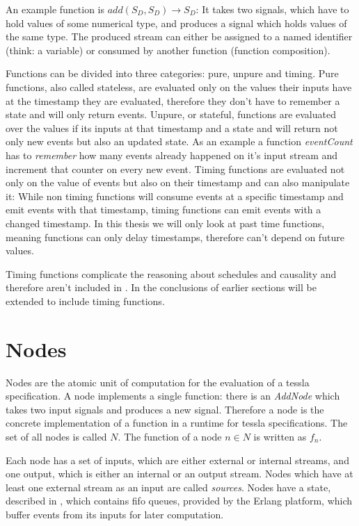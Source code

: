 An example function is \(\mathit{add}(S_D,S_D) \rightarrow S_D\): It takes two signals, which have to hold values of some numerical type, and produces a signal which holds values of the same type.
The produced stream can either be assigned to a named identifier (think: a variable) or consumed by another function (function composition).

Functions can be divided into three categories: pure, unpure and timing.
Pure functions, also called stateless, are evaluated only on the values their inputs have at the timestamp they are evaluated, therefore they don't have to remember a state and will only return events.
Unpure, or stateful, functions are evaluated over the values if its inputs at that timestamp and a state and will return not only new events but also an updated state.
As an example a function \emph{eventCount} has to \emph{remember} how many events already happened on it's input stream and increment that counter on every new event.
Timing functions are evaluated not only on the value of events but also on their timestamp and can also manipulate it:
While non timing functions will consume events at a specific timestamp and emit events with that timestamp, timing functions can emit events with a changed timestamp.
In this thesis we will only look at past time functions, meaning functions can only delay timestamps, therefore can't depend on future values.

Timing functions complicate the reasoning about schedules and causality and therefore aren't included in .
In  the conclusions of earlier sections will be extended to include timing functions.

\section{Nodes}
\label{sec:definitions:nodes}

Nodes are the atomic unit of computation for the evaluation of a \gls{tessla} specification.
A node implements a single function: there is an \emph{AddNode} which takes two input signals and produces a new signal.
Therefore a node is the concrete implementation of a function in a runtime for \gls{tessla} specifications.
The set of all nodes is called \(N\).
The function of a node \(n \in N\) is written as \(f_n\).

Each node has a set of inputs, which are either external or internal streams, and one output, which is either an internal or an output stream.
Nodes which have at least one external stream as an input are called \emph{sources}.
Nodes have a state, described in , which contains \gls{fifo} queues, provided by the Erlang platform, which buffer events from its inputs for later computation.

